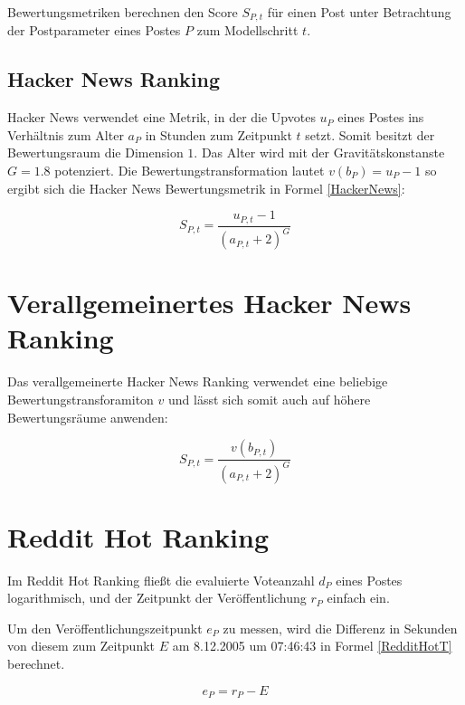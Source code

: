 Bewertungsmetriken berechnen den Score $S_{P,t}$ für einen Post unter Betrachtung der Postparameter eines Postes $P$ zum Modellschritt $t$.
	
\subsection{Hacker News Ranking}
\label{seqHackerNews}

Hacker News verwendet eine Metrik, in der die Upvotes $u_{P}$ eines Postes ins Verhältnis zum Alter $a_{P}$ in Stunden zum Zeitpunkt $t$ setzt. Somit besitzt der Bewertungsraum die Dimension $1$. Das Alter wird mit der Gravitätskonstanste $G = 1.8$ potenziert. Die Bewertungstransformation lautet $v(b_P) = u_P - 1$ so ergibt sich die Hacker News Bewertungsmetrik in Formel \ref{HackerNews}:
 
\begin{equation}
\label{HackerNews}
S_{P,t} = \frac{u_{P,t} - 1}{(a_{P,t} + 2)^{G}}
\end{equation}

\section{Verallgemeinertes Hacker News Ranking}
\label{seqvHackerNews}
Das verallgemeinerte Hacker News Ranking verwendet eine beliebige Bewertungstransforamiton $v$ und lässt sich somit auch auf höhere Bewertungsräume anwenden:

\begin{equation}
\label{vHackerNews}
S_{P,t} = \frac{v(b_{P,t})}{(a_{P,t} + 2)^{G}}
\end{equation}


\section{Reddit Hot Ranking}


Im Reddit Hot Ranking fließt die evaluierte Voteanzahl $d_P$ eines Postes logarithmisch, und der Zeitpunkt der Veröffentlichung $r_P$ einfach ein. 

Um den Veröffentlichungszeitpunkt $e_P$ zu messen, wird die Differenz in Sekunden von diesem zum Zeitpunkt $E$ am 8.12.2005 um 07:46:43 in Formel \ref{RedditHotT} berechnet.

\begin{equation}
\label{RedditHotT}
e_{P} = r_{P} - E  
\end{equation}

